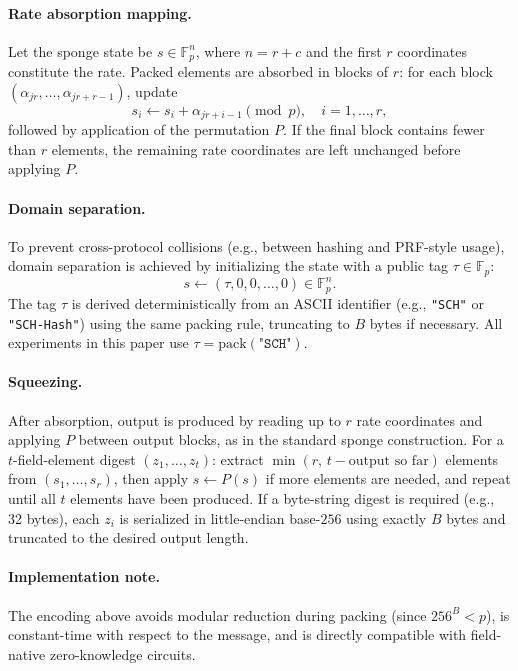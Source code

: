 ﻿\documentclass[english]{aucmcs}
\newcommand{\Fp}{\mathbb{F}_p}
\begin{document}
\paragraph{Rate absorption mapping.}
Let the sponge state be $s \in \Fp^n$, where $n = r + c$ and the first $r$
coordinates constitute the rate.
Packed elements are absorbed in blocks of $r$: for each block
$(\alpha_{jr},\ldots,\alpha_{jr+r-1})$, update
\[
s_i \leftarrow s_i + \alpha_{jr+i-1} \pmod{p}, \quad i = 1,\ldots,r,
\]
followed by application of the permutation $P$.
If the final block contains fewer than $r$ elements, the remaining rate
coordinates are left unchanged before applying $P$.

\paragraph{Domain separation.}
To prevent cross-protocol collisions (e.g., between hashing and PRF-style usage),
domain separation is achieved by initializing the state with a public tag
$\tau \in \Fp$:
\[
s \leftarrow (\tau,0,0,\ldots,0) \in \Fp^n.
\]
The tag $\tau$ is derived deterministically from an ASCII identifier (e.g.,
\texttt{"SCH"} or \texttt{"SCH-Hash"}) using the same packing rule, truncating to
$B$ bytes if necessary.
All experiments in this paper use $\tau = \mathrm{pack}(\texttt{"SCH"})$.

\paragraph{Squeezing.}
After absorption, output is produced by reading up to $r$ rate coordinates and
applying $P$ between output blocks, as in the standard sponge construction.
For a $t$-field-element digest $(z_1,\ldots,z_t)$: extract
$\min(r,\, t - \text{output so far})$ elements from
$(s_1,\ldots,s_r)$, then apply $s \leftarrow P(s)$ if more elements are
needed, and repeat until all $t$ elements have been produced.
If a byte-string digest is required (e.g., 32 bytes), each $z_i$ is serialized in
little-endian base-$256$ using exactly $B$ bytes and truncated to the desired
output length.

\paragraph{Implementation note.}
The encoding above avoids modular reduction during packing (since $256^B < p$),
is constant-time with respect to the message, and is directly compatible with
field-native zero-knowledge circuits.
\end{document}
